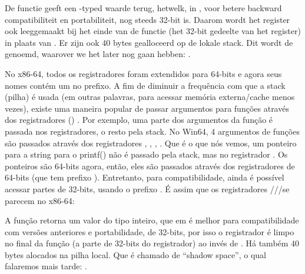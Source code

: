 
De \main functie geeft een \Tint{}-typed waarde terug, hetwelk, in \CCpp, voor betere backward compatibiliteit
en portabiliteit, nog steeds 32-bit is. Daarom wordt het \EAX register ook leeggemaakt bij het einde van de functie
(het 32-bit gedeelte van het register) in plaats van \RAX{}.
Er zijn ook 40 bytes gealloceerd op de lokale stack.
Dit wordt de  genoemd, waarover we het later nog gaan hebben: .
\fi %

\ifdefined\BRAZILIAN
No x86-64, todos os registradores foram extendidos para 64-bits e agora seus nomes contém um  no prefixo.
A fim de diminuir a frequência com que a stack (pilha) é usada (em outras palavras, para acessar memória externa/cache menos vezes),
existe uma maneira popular de passar argumentos para funções através dos registradores ()
\ifx\LITE\undefined {} \fi
.
Por exemplo, uma parte dos argumentos da função é passada nos registradores, o resto pela stack.
No Win64, 4 argumentos de funções são passados através dos registradores \RCX, \RDX, , .
Que é o que nós vemos, um ponteiro para a string para o printf() não é passado pela stack, mas no registrador \RCX.
Os ponteiros são 64-bits agora, então, eles são passados através dos registradores de 64-bits (que tem prefixo ).
Entretanto, para compatibilidade, ainda é possível acessar partes de 32-bits, usando o prefixo .
É assim que os registradores \RAX/\EAX/\AX/\AL se parecem no x86-64:


A função \main retorna um valor do tipo inteiro, que em \CCpp é melhor para compatibilidade com versões anteriores e portabilidade,
de 32-bits, por isso o registrador \EAX é limpo no final da função (a parte de 32-bits do registrador) ao invés de \RAX.
Há também 40 bytes alocados na pilha local.
Que é chamado de ``shadow space'', o qual falaremos mais tarde: .
\fi %


